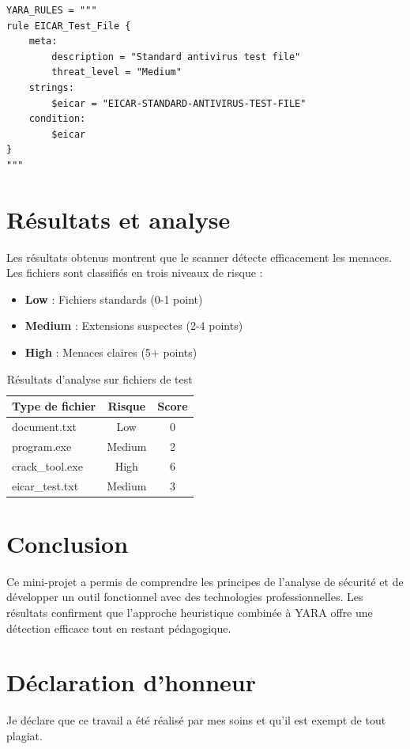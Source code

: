 \documentclass[a4paper,12pt]{article}
\begin{document}
\begin{lstlisting}[caption={Règles YARA intégrées}]
YARA_RULES = """
rule EICAR_Test_File {
    meta:
        description = "Standard antivirus test file"
        threat_level = "Medium"
    strings:
        $eicar = "EICAR-STANDARD-ANTIVIRUS-TEST-FILE"
    condition:
        $eicar
}
"""
\end{lstlisting}

\section{Résultats et analyse}
Les résultats obtenus montrent que le scanner détecte efficacement les menaces.
Les fichiers sont classifiés en trois niveaux de risque :
\begin{itemize}
\item \textbf{Low} : Fichiers standards (0-1 point)
\item \textbf{Medium} : Extensions suspectes (2-4 points)
\item \textbf{High} : Menaces claires (5+ points)
\end{itemize}

\begin{table}[h]
\centering
\begin{tabular}{|l|c|c|}
\hline
\textbf{Type de fichier} & \textbf{Risque} & \textbf{Score} \\
\hline
document.txt & Low & 0 \\
program.exe & Medium & 2 \\
crack\_tool.exe & High & 6 \\
eicar\_test.txt & Medium & 3 \\
\hline
\end{tabular}
\caption{Résultats d'analyse sur fichiers de test}
\end{table}

\section{Conclusion}
Ce mini-projet a permis de comprendre les principes de l'analyse de sécurité
et de développer un outil fonctionnel avec des technologies professionnelles.
Les résultats confirment que l'approche heuristique combinée à YARA offre
une détection efficace tout en restant pédagogique.

\section*{Déclaration d'honneur}
Je déclare que ce travail a été réalisé par mes soins et qu'il est
exempt de tout plagiat.
\end{document}
